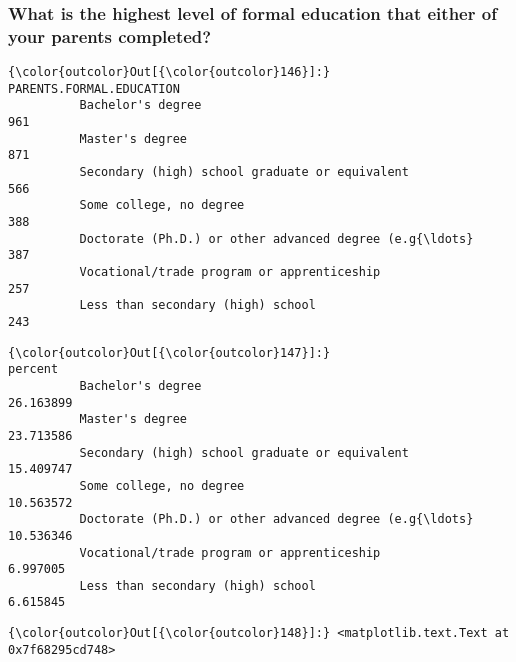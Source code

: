 \documentclass[11pt]{article}
\begin{document}
    \subsubsection{What is the highest level of formal education that either
of your parents
completed?}\label{what-is-the-highest-level-of-formal-education-that-either-of-your-parents-completed}


            \begin{Verbatim}[commandchars=\\\{\}]
{\color{outcolor}Out[{\color{outcolor}146}]:}                                                     PARENTS.FORMAL.EDUCATION
          Bachelor's degree                                                        961
          Master's degree                                                          871
          Secondary (high) school graduate or equivalent                           566
          Some college, no degree                                                  388
          Doctorate (Ph.D.) or other advanced degree (e.g{\ldots}                       387
          Vocational/trade program or apprenticeship                               257
          Less than secondary (high) school                                        243
\end{Verbatim}
        

            \begin{Verbatim}[commandchars=\\\{\}]
{\color{outcolor}Out[{\color{outcolor}147}]:}                                                       percent
          Bachelor's degree                                   26.163899
          Master's degree                                     23.713586
          Secondary (high) school graduate or equivalent      15.409747
          Some college, no degree                             10.563572
          Doctorate (Ph.D.) or other advanced degree (e.g{\ldots}  10.536346
          Vocational/trade program or apprenticeship           6.997005
          Less than secondary (high) school                    6.615845
\end{Verbatim}
        

            \begin{Verbatim}[commandchars=\\\{\}]
{\color{outcolor}Out[{\color{outcolor}148}]:} <matplotlib.text.Text at 0x7f68295cd748>
\end{Verbatim}
        
    \begin{center}
    \end{center}
    { \hspace*{\fill} \\}
    
\end{document}

